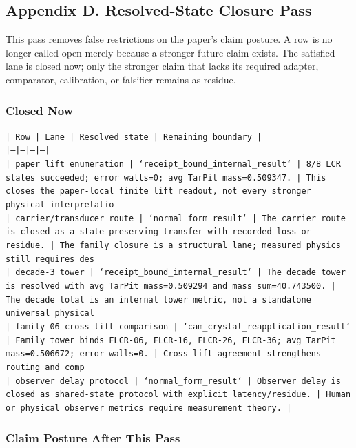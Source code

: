 \documentclass[11pt]{article}
\begin{document}
\subsection*{Appendix D. Resolved-State Closure Pass}

This pass removes false restrictions on the paper's claim posture. A row is no longer called open merely because a stronger future claim exists. The satisfied lane is closed now; only the stronger claim that lacks its required adapter, comparator, calibration, or falsifier remains as residue.

\subsubsection*{Closed Now}

\noindent\texttt{| Row | Lane | Resolved state | Remaining boundary |}\\
\noindent\texttt{|---|---|---|---|}\\
\noindent\texttt{| paper lift enumeration | `receipt\_bound\_internal\_result` | 8/8 LCR states succeeded; error walls=0; avg TarPit mass=0.509347. | This closes the paper-local finite lift readout, not every stronger physical interpretatio}\\
\noindent\texttt{| carrier/transducer route | `normal\_form\_result` | The carrier route is closed as a state-preserving transfer with recorded loss or residue. | The family closure is a structural lane; measured physics still requires des}\\
\noindent\texttt{| decade-3 tower | `receipt\_bound\_internal\_result` | The decade tower is resolved with avg TarPit mass=0.509294 and mass sum=40.743500. | The decade total is an internal tower metric, not a standalone universal physical }\\
\noindent\texttt{| family-06 cross-lift comparison | `cam\_crystal\_reapplication\_result` | Family tower binds FLCR-06, FLCR-16, FLCR-26, FLCR-36; avg TarPit mass=0.506672; error walls=0. | Cross-lift agreement strengthens routing and comp}\\
\noindent\texttt{| observer delay protocol | `normal\_form\_result` | Observer delay is closed as shared-state protocol with explicit latency/residue. | Human or physical observer metrics require measurement theory. |}\\

\subsubsection*{Claim Posture After This Pass}
\end{document}
